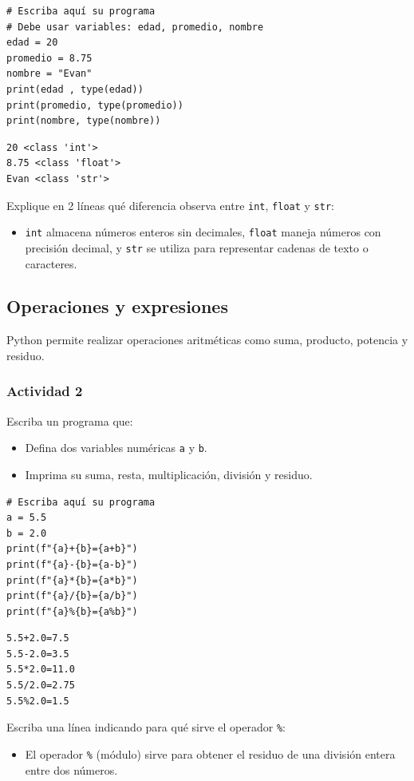 \documentclass{article}
\begin{document}
\begin{verbatim}
# Escriba aquí su programa
# Debe usar variables: edad, promedio, nombre
edad = 20
promedio = 8.75
nombre = "Evan"
print(edad , type(edad))
print(promedio, type(promedio))
print(nombre, type(nombre))
\end{verbatim}

\begin{verbatim}
20 <class 'int'>
8.75 <class 'float'>
Evan <class 'str'>
\end{verbatim}


Explique en 2 líneas qué diferencia observa entre \texttt{int}, \texttt{float} y \texttt{str}:
\begin{itemize}
\item \texttt{int} almacena números enteros sin decimales, \texttt{float} maneja números con precisión decimal, y \texttt{str} se utiliza para representar cadenas de texto o caracteres.
\end{itemize}

\subsection{Operaciones y expresiones}
\label{sec:orgb5bca89}
Python permite realizar operaciones aritméticas como suma, producto, potencia y residuo.

\subsubsection{Actividad 2}
\label{sec:org9b5182f}
Escriba un programa que:
\begin{itemize}
\item Defina dos variables numéricas \texttt{a} y \texttt{b}.
\item Imprima su suma, resta, multiplicación, división y residuo.
\end{itemize}

\begin{verbatim}
# Escriba aquí su programa
a = 5.5
b = 2.0
print(f"{a}+{b}={a+b}")
print(f"{a}-{b}={a-b}")
print(f"{a}*{b}={a*b}")
print(f"{a}/{b}={a/b}")
print(f"{a}%{b}={a%b}")
\end{verbatim}

\begin{verbatim}
5.5+2.0=7.5
5.5-2.0=3.5
5.5*2.0=11.0
5.5/2.0=2.75
5.5%2.0=1.5
\end{verbatim}


Escriba una línea indicando para qué sirve el operador \texttt{\%}:
\begin{itemize}
\item El operador \texttt{\%} (módulo) sirve para obtener el residuo de una división entera entre dos números.
\end{itemize}
\end{document}
